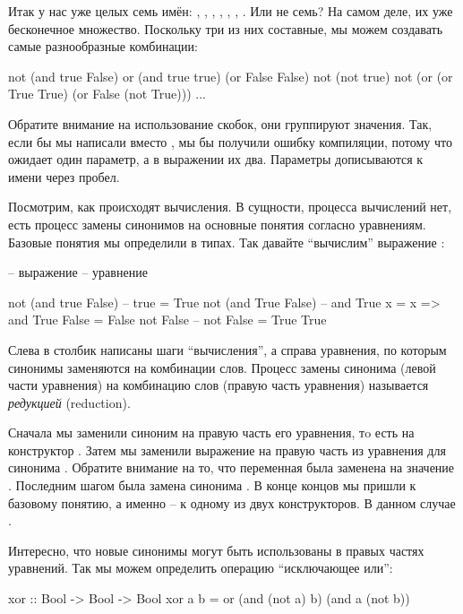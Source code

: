 Итак у нас уже целых семь имён: , , ,
, , , . Или не семь? На самом деле, их
уже бесконечное множество. Поскольку три из них составные, мы можем
создавать самые разнообразные комбинации:


\begin{code}
not (and true False)
or (and true true) (or False False)
not (not true)
not (or (or True True) (or False (not True)))
...
\end{code}

Обратите внимание на использование скобок, они группируют значения. Так,
если бы мы написали  вместо , мы бы
получили ошибку компиляции, потому что  ожидает один параметр, а
в выражении  их два. Параметры дописываются к имени
через пробел.

Посмотрим, как происходят вычисления. В сущности, процесса вычислений
нет, есть процесс замены синонимов на основные понятия согласно
уравнениям. Базовые понятия мы определили в типах. Так давайте
``вычислим'' выражение :


\begin{code}
-- выражение            --  уравнение

not (and true False)    --  true        = True
not (and True False)    --  and True  x = x     => and True False = False
not False               --  not False   = True
True
\end{code}

Слева в столбик написаны шаги ``вычисления'', а справа уравнения, по
которым синонимы заменяются на комбинации слов. Процесс замены синонима
(левой части уравнения) на комбинацию слов (правую часть уравнения)
называется \emph{редукцией} (reduction).

Сначала мы заменили синоним  на правую часть его уравнения, тo
есть на конструктор . Затем мы заменили выражение
 на правую часть из уравнения для синонима
. Обратите внимание на то, что переменная  была заменена
на значение . Последним шагом была замена синонима . В
конце концов мы пришли к базовому понятию, а именно -- к одному из двух
конструкторов. В данном случае .

Интересно, что новые синонимы могут быть использованы в правых частях
уравнений. Так мы можем определить операцию ``исключающее или'':


\begin{code}
xor :: Bool -> Bool -> Bool
xor a b = or (and (not a) b) (and a (not b))
\end{code}

